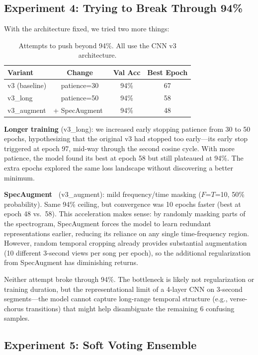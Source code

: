 \subsection{Experiment 4: Trying to Break Through 94\%}

With the architecture fixed, we tried two more things:

\begin{table}[h]
\centering
\caption{Attempts to push beyond 94\%. All use the CNN v3 architecture.}
\label{tab:ablation}
\begin{tabular}{@{}lccc@{}}
\toprule
Variant & Change & Val Acc & Best Epoch \\
\midrule
v3 (baseline) & patience=30 & 94\% & 67 \\
v3\_long & patience=50 & 94\% & 58 \\
v3\_augment & + SpecAugment~\cite{park2019specaugment} & 94\% & 48 \\
\bottomrule
\end{tabular}
\end{table}

\textbf{Longer training} (v3\_long): we increased early stopping patience from 30 to 50 epochs, hypothesizing that the original v3 had stopped too early---its early stop triggered at epoch 97, mid-way through the second cosine cycle. With more patience, the model found its best at epoch 58 but still plateaued at 94\%. The extra epochs explored the same loss landscape without discovering a better minimum.

\textbf{SpecAugment~\cite{park2019specaugment}} (v3\_augment): mild frequency/time masking ($F$=$T$=10, 50\% probability). Same 94\% ceiling, but convergence was 10 epochs faster (best at epoch 48 vs.\ 58). This acceleration makes sense: by randomly masking parts of the spectrogram, SpecAugment forces the model to learn redundant representations earlier, reducing its reliance on any single time-frequency region. However, random temporal cropping already provides substantial augmentation (10 different 3-second views per song per epoch), so the additional regularization from SpecAugment has diminishing returns.

Neither attempt broke through 94\%. The bottleneck is likely not regularization or training duration, but the representational limit of a 4-layer CNN on 3-second segments---the model cannot capture long-range temporal structure (e.g., verse-chorus transitions) that might help disambiguate the remaining 6 confusing samples.

\subsection{Experiment 5: Soft Voting Ensemble}
\label{sec:ensemble}


